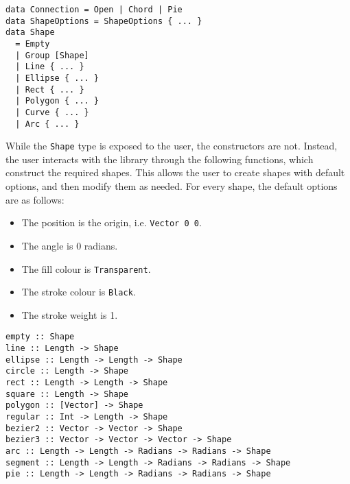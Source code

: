 \documentclass[../main.tex]{subfiles}
\begin{document}
                \begin{lstlisting}[label={lst:shape}, caption={The Shape type definition.}]
data Connection = Open | Chord | Pie
data ShapeOptions = ShapeOptions { ... }
data Shape
  = Empty
  | Group [Shape]
  | Line { ... }
  | Ellipse { ... }
  | Rect { ... }
  | Polygon { ... }
  | Curve { ... }
  | Arc { ... }\end{lstlisting}

                While the \verb|Shape| type is exposed to the user, the constructors are not.
                Instead, the user interacts with the library through the following functions,
                    which construct the required shapes.
                This allows the user to create shapes with default options, and then modify
                    them as needed.
                For every shape, the default options are as follows:
                \begin{itemize}
                    \item The position is the origin, i.e. \verb|Vector 0 0|.
                    \item The angle is 0 radians.
                    \item The fill colour is \verb|Transparent|.
                    \item The stroke colour is \verb|Black|.
                    \item The stroke weight is 1.
                \end{itemize}

                \begin{lstlisting}[label={lst:shapes}, caption={The functions to create shapes.}]
empty :: Shape
line :: Length -> Shape
ellipse :: Length -> Length -> Shape
circle :: Length -> Shape
rect :: Length -> Length -> Shape
square :: Length -> Shape
polygon :: [Vector] -> Shape
regular :: Int -> Length -> Shape
bezier2 :: Vector -> Vector -> Shape
bezier3 :: Vector -> Vector -> Vector -> Shape
arc :: Length -> Length -> Radians -> Radians -> Shape
segment :: Length -> Length -> Radians -> Radians -> Shape
pie :: Length -> Length -> Radians -> Radians -> Shape\end{lstlisting}
\end{document}
